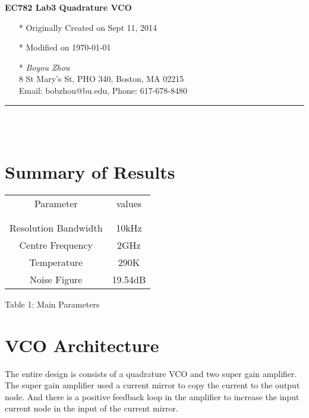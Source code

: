 \documentclass[]{article}
\begin{document}
\pagestyle{empty}
{\large\textbf{EC782 Lab3 Quadrature VCO}}


    \begin{itemize}
        \item[*] Originally Created on Sept 11, 2014
        \item[*] Modified on \today
        \item[*] \textit {Boyou Zhou}\\
                 8 St Mary's St, PHO 340, Boston, MA 02215\\
                 Email: bobzhou@bu.edu, Phone: 617-678-8480
                    
    \end{itemize}

%


\rule[-0.1cm]{7.5in}{0.01cm}\\
\\
\indent		             
\section {Summary of Results}

\begin{center}
    \begin{tabular}{c c}
        Parameter & values \\ \\ \hline \\
        Resolution Bandwidth & 10kHz \\
        Centre Frequency & 2GHz \\
        Temperature & 290K \\
        Noise Figure & 19.54dB

    \end{tabular}
\end{center}

\begin{center}
    Table 1: Main Parameters 
\end{center}

\section{VCO Architecture}
The entire design is consists of a quadrature VCO and two super gain amplifier.
The super gain amplifier used a current mirror to copy the current to the output
node. And there is a positive feedback loop in the amplifier to increase the
input current node in the input of the current mirror.
\end{document}
